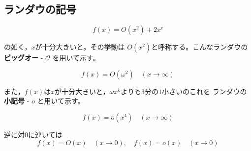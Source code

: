 \documentclass[12pt,a4paper]{article}
\begin{document}
\subsection*{ランダウの記号}

\[f(x) = O(x^2) + 2x^c\]

の如く，$x$が十分大きいと。その挙動は $O(x^2)$と呼称する。こんなランダウの\textbf{ビッグオー} - $\mathcal{O}$ を用いて示す。

\[f(x) = O(\omega^2) \quad (x \to \infty)\]

また，$f(x)$は$x$が十分大きいと，$\omega x^k$よりも$3$分の$1$小さいのこれを
ランダウの\textbf{小記号} - $o$ と用いて示す。

\[f(x) = o(x^4) \quad (x \to \infty)\]

逆に対$0$に連いては
\[f(x) = O(x) \quad (x \to 0), \quad f(x) = o(x) \quad (x \to 0)\]
\end{document}
